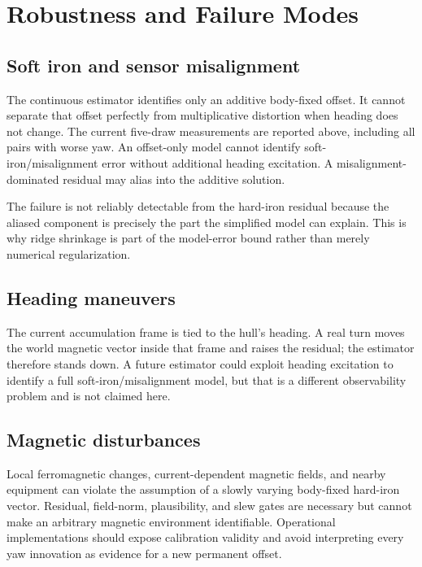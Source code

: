 \documentclass[conference]{IEEEtran}
\begin{document}
\section{Robustness and Failure Modes}
\label{sec:limits}

\subsection{Soft iron and sensor misalignment}

The continuous estimator identifies only an additive body-fixed offset.  It cannot
separate that offset perfectly from multiplicative distortion when heading does not
change. The current five-draw measurements are reported above, including
all pairs with worse yaw. An offset-only model cannot identify
soft-iron/misalignment error without additional heading excitation.
A misalignment-dominated residual may alias into the additive solution.

The failure is not reliably detectable from the hard-iron residual because the
aliased component is precisely the part the simplified model can explain.  This is
why ridge shrinkage is part of the model-error bound rather than merely numerical
regularization.

\subsection{Heading maneuvers}

The current accumulation frame is tied to the hull's heading.  A real turn moves the
world magnetic vector inside that frame and raises the residual; the estimator
therefore stands down.  A future estimator could exploit heading excitation to
identify a full soft-iron/misalignment model, but that is a different observability
problem and is not claimed here.

\subsection{Magnetic disturbances}

Local ferromagnetic changes, current-dependent magnetic fields, and nearby equipment
can violate the assumption of a slowly varying body-fixed hard-iron vector.  Residual,
field-norm, plausibility, and slew gates are necessary but cannot make an arbitrary
magnetic environment identifiable.  Operational implementations should expose
calibration validity and avoid interpreting every yaw innovation as evidence for a
new permanent offset.
\end{document}
